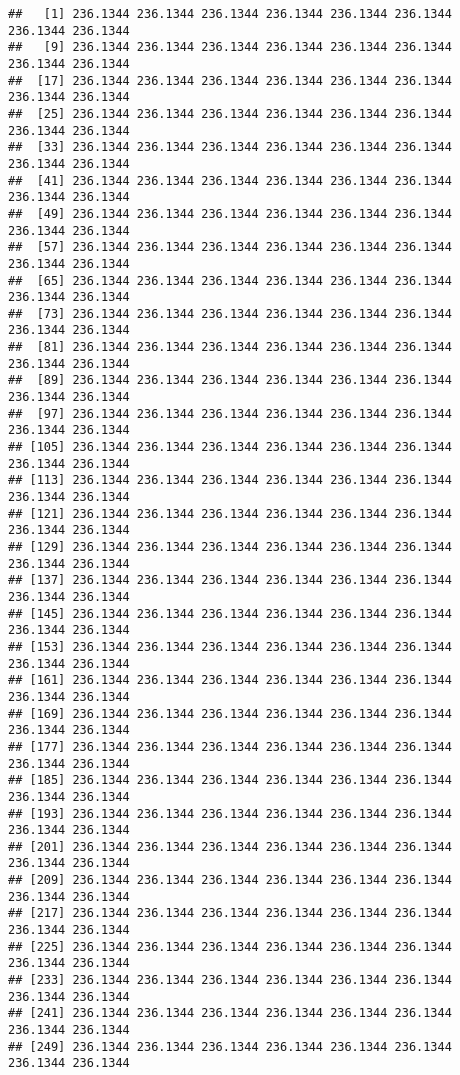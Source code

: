 \documentclass[
]{article}
\begin{document}
\begin{verbatim}
##   [1] 236.1344 236.1344 236.1344 236.1344 236.1344 236.1344 236.1344 236.1344
##   [9] 236.1344 236.1344 236.1344 236.1344 236.1344 236.1344 236.1344 236.1344
##  [17] 236.1344 236.1344 236.1344 236.1344 236.1344 236.1344 236.1344 236.1344
##  [25] 236.1344 236.1344 236.1344 236.1344 236.1344 236.1344 236.1344 236.1344
##  [33] 236.1344 236.1344 236.1344 236.1344 236.1344 236.1344 236.1344 236.1344
##  [41] 236.1344 236.1344 236.1344 236.1344 236.1344 236.1344 236.1344 236.1344
##  [49] 236.1344 236.1344 236.1344 236.1344 236.1344 236.1344 236.1344 236.1344
##  [57] 236.1344 236.1344 236.1344 236.1344 236.1344 236.1344 236.1344 236.1344
##  [65] 236.1344 236.1344 236.1344 236.1344 236.1344 236.1344 236.1344 236.1344
##  [73] 236.1344 236.1344 236.1344 236.1344 236.1344 236.1344 236.1344 236.1344
##  [81] 236.1344 236.1344 236.1344 236.1344 236.1344 236.1344 236.1344 236.1344
##  [89] 236.1344 236.1344 236.1344 236.1344 236.1344 236.1344 236.1344 236.1344
##  [97] 236.1344 236.1344 236.1344 236.1344 236.1344 236.1344 236.1344 236.1344
## [105] 236.1344 236.1344 236.1344 236.1344 236.1344 236.1344 236.1344 236.1344
## [113] 236.1344 236.1344 236.1344 236.1344 236.1344 236.1344 236.1344 236.1344
## [121] 236.1344 236.1344 236.1344 236.1344 236.1344 236.1344 236.1344 236.1344
## [129] 236.1344 236.1344 236.1344 236.1344 236.1344 236.1344 236.1344 236.1344
## [137] 236.1344 236.1344 236.1344 236.1344 236.1344 236.1344 236.1344 236.1344
## [145] 236.1344 236.1344 236.1344 236.1344 236.1344 236.1344 236.1344 236.1344
## [153] 236.1344 236.1344 236.1344 236.1344 236.1344 236.1344 236.1344 236.1344
## [161] 236.1344 236.1344 236.1344 236.1344 236.1344 236.1344 236.1344 236.1344
## [169] 236.1344 236.1344 236.1344 236.1344 236.1344 236.1344 236.1344 236.1344
## [177] 236.1344 236.1344 236.1344 236.1344 236.1344 236.1344 236.1344 236.1344
## [185] 236.1344 236.1344 236.1344 236.1344 236.1344 236.1344 236.1344 236.1344
## [193] 236.1344 236.1344 236.1344 236.1344 236.1344 236.1344 236.1344 236.1344
## [201] 236.1344 236.1344 236.1344 236.1344 236.1344 236.1344 236.1344 236.1344
## [209] 236.1344 236.1344 236.1344 236.1344 236.1344 236.1344 236.1344 236.1344
## [217] 236.1344 236.1344 236.1344 236.1344 236.1344 236.1344 236.1344 236.1344
## [225] 236.1344 236.1344 236.1344 236.1344 236.1344 236.1344 236.1344 236.1344
## [233] 236.1344 236.1344 236.1344 236.1344 236.1344 236.1344 236.1344 236.1344
## [241] 236.1344 236.1344 236.1344 236.1344 236.1344 236.1344 236.1344 236.1344
## [249] 236.1344 236.1344 236.1344 236.1344 236.1344 236.1344 236.1344 236.1344

\end{verbatim}
\end{document}
